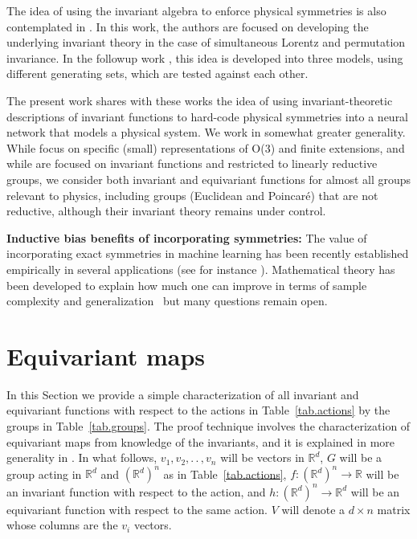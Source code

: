 \documentclass{article}
\renewcommand{\paragraph}[1]{\par\textbf{#1}}
\theoremstyle{Hogg}
\renewcommand{\ldots}{.\,.\,}
\begin{document}
The idea of using the invariant algebra to enforce physical symmetries is also contemplated in \cite{gripaios2021lorentz}. In this work, the authors are focused on developing the underlying invariant theory in the case of simultaneous Lorentz and permutation invariance. In the followup work \cite{haddadin2021invariant}, this idea is developed into three models, using different generating sets, which are tested against each other.

The present work shares with these works the idea of using invariant-theoretic descriptions of invariant functions to hard-code physical symmetries into a neural network that models a physical system. We work in somewhat greater generality. While \cite{ling2016machine, ling2016reynolds} focus on specific (small) representations of O($3$) and finite extensions, and while \cite{gripaios2021lorentz, haddadin2021invariant}  are focused on invariant functions and restricted to linearly reductive groups, we consider both invariant and equivariant functions for almost all groups relevant to physics, including groups (Euclidean and Poincar\'e) that are not reductive, although their invariant theory remains under control.

\paragraph{Inductive bias benefits of incorporating symmetries:} The value of incorporating exact symmetries in machine learning has been recently established empirically in several applications (see for instance \cite{wang2021incorporating}).  Mathematical theory has been developed to explain how much one can improve in terms of sample complexity and generalization~\cite{mei2021learning, bietti2021sample, elesedy2021provably} but many questions remain open.

\section{Equivariant maps}
\label{sec.equivariance}

In this Section we provide a simple characterization of all invariant and equivariant functions with respect to the actions in Table~\ref{tab.actions} by the groups in Table~\ref{tab.groups}.
The proof technique involves the characterization of equivariant maps from knowledge of the invariants, and it is explained in more generality in \cite{blum-smith}.
In what follows, $v_1, v_2, \ldots, v_n$ will be vectors in $\mathbb{R}^d$, $G$ will be a group acting in $\mathbb R^d$ and $(\mathbb R^d)^n$ as in Table~\ref{tab.actions}, $f:(\mathbb R^d)^n \to \mathbb R$ will be an invariant function with respect to the action, and $h:(\mathbb R^d)^n\to \mathbb R^d$ will be an equivariant function with respect to the same action.
$V$ will denote a $d\times n$ matrix whose columns are the $v_i$ vectors.
\end{document}
